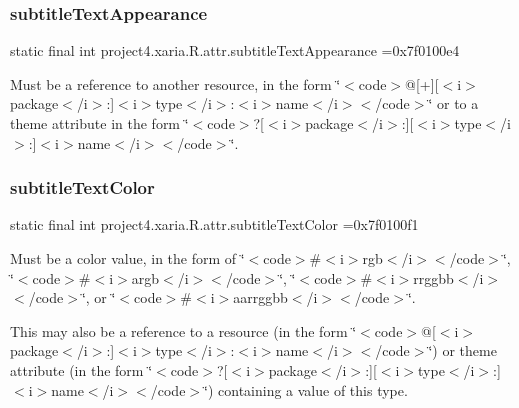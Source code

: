 \subsubsection{\texorpdfstring{subtitle\+Text\+Appearance}{subtitleTextAppearance}}
{\footnotesize\ttfamily static final int project4.\+xaria.\+R.\+attr.\+subtitle\+Text\+Appearance =0x7f0100e4\hspace{0.3cm}{\ttfamily [static]}}

Must be a reference to another resource, in the form \char`\"{}$<$code$>$@\mbox{[}+\mbox{]}\mbox{[}$<$i$>$package$<$/i$>$\+:\mbox{]}$<$i$>$type$<$/i$>$\+:$<$i$>$name$<$/i$>$$<$/code$>$\char`\"{} or to a theme attribute in the form \char`\"{}$<$code$>$?\mbox{[}$<$i$>$package$<$/i$>$\+:\mbox{]}\mbox{[}$<$i$>$type$<$/i$>$\+:\mbox{]}$<$i$>$name$<$/i$>$$<$/code$>$\char`\"{}. \mbox{\label{classproject4_1_1xaria_1_1R_1_1attr_ae26675919e34b608bcbf0cae7faef3aa}} 
\subsubsection{\texorpdfstring{subtitle\+Text\+Color}{subtitleTextColor}}
{\footnotesize\ttfamily static final int project4.\+xaria.\+R.\+attr.\+subtitle\+Text\+Color =0x7f0100f1\hspace{0.3cm}{\ttfamily [static]}}

Must be a color value, in the form of \char`\"{}$<$code$>$\#$<$i$>$rgb$<$/i$>$$<$/code$>$\char`\"{}, \char`\"{}$<$code$>$\#$<$i$>$argb$<$/i$>$$<$/code$>$\char`\"{}, \char`\"{}$<$code$>$\#$<$i$>$rrggbb$<$/i$>$$<$/code$>$\char`\"{}, or \char`\"{}$<$code$>$\#$<$i$>$aarrggbb$<$/i$>$$<$/code$>$\char`\"{}. 

This may also be a reference to a resource (in the form \char`\"{}$<$code$>$@\mbox{[}$<$i$>$package$<$/i$>$\+:\mbox{]}$<$i$>$type$<$/i$>$\+:$<$i$>$name$<$/i$>$$<$/code$>$\char`\"{}) or theme attribute (in the form \char`\"{}$<$code$>$?\mbox{[}$<$i$>$package$<$/i$>$\+:\mbox{]}\mbox{[}$<$i$>$type$<$/i$>$\+:\mbox{]}$<$i$>$name$<$/i$>$$<$/code$>$\char`\"{}) containing a value of this type. \mbox{\label{classproject4_1_1xaria_1_1R_1_1attr_a97c5a3d1486c37fd9e9afd92f3a388bf}} 

